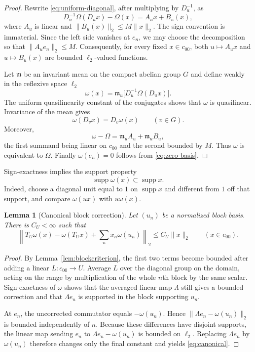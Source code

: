 \documentclass[11pt]{article}
\newtheorem{lemma}[theorem]{Lemma}
\newcommand{\czz}{c_{00}}
\newcommand{\supp}{\operatorname{supp}}
\newcommand{\Dop}[1]{D_{#1}}
\begin{document}
\begin{proof}
Rewrite \eqref{eq:uniform-diagonal}, after multiplying by $\Dop u^{-1}$,
as
\[
 \Dop u^{-1}\Omega(\Dop u x)-\Omega(x)=A_u x+B_u(x),
\]
where $A_u$ is linear and $\|B_u(x)\|_2\le M\|x\|_2$.  The sign convention
is immaterial.  Since the left side vanishes at $e_n$, we may choose the
decomposition so that $\|A_ue_n\|_2\le M$.  Consequently, for every fixed
$x\in\czz$, both $u\mapsto A_ux$ and $u\mapsto B_u(x)$ are bounded
$\ell_2$-valued functions.

Let $\mathfrak m$ be an invariant mean on the compact abelian group $G$ and
define weakly in the reflexive space $\ell_2$
\[
 \omega(x)=\mathfrak m_u\big[\Dop u^{-1}\Omega(\Dop u x)\big].
\]
The uniform quasilinearity constant of the conjugates shows that $\omega$ is
quasilinear.  Invariance of the mean gives
\[
 \omega(\Dop v x)=\Dop v\omega(x) \qquad(v\in G).
\]
Moreover,
\[
 \omega-\Omega=\mathfrak m_u A_u+\mathfrak m_u B_u,
\]
the first summand being linear on $\czz$ and the second bounded by $M$.
Thus $\omega$ is equivalent to $\Omega$.  Finally $\omega(e_n)=0$ follows
from \eqref{eq:zero-basis}.
\end{proof}

Sign-exactness implies the support property
\begin{equation}\label{eq:support}
 \supp\omega(x)\subset\supp x.
\end{equation}
Indeed, choose a diagonal unit equal to $1$ on $\supp x$ and different from
$1$ off that support, and compare $\omega(ux)$ with $u\omega(x)$.

\begin{lemma}[Canonical block correction]\label{lem:canonical}
Let $(u_n)$ be a normalized block basis.  There is $C_U<\infty$ such that
\begin{equation}\label{eq:canonical}
 \left\|T_U\omega(x)-\omega(T_Ux)+
       \sum_nx_n\omega(u_n)\right\|_2
 \le C_U\|x\|_2
 \qquad(x\in\czz).
\end{equation}
\end{lemma}

\begin{proof}
By Lemma~\ref{lem:blockcriterion}, the first two terms become bounded after
adding a linear $L:\czz\to U$.  Average $L$ over the diagonal group on the
domain, acting on the range by multiplication of the whole $n$th block by
the same scalar.  Sign-exactness of $\omega$ shows that the averaged linear map
$\Lambda$ still gives a bounded correction and that $\Lambda e_n$ is
supported in the block supporting $u_n$.

At $e_n$, the uncorrected commutator equals $-\omega(u_n)$.  Hence
$\|\Lambda e_n-\omega(u_n)\|_2$ is bounded independently of $n$.  Because
these differences have disjoint supports, the linear map sending
$e_n$ to $\Lambda e_n-\omega(u_n)$ is bounded on $\ell_2$.  Replacing
$\Lambda e_n$ by $\omega(u_n)$ therefore changes only the final constant
and yields \eqref{eq:canonical}.
\end{proof}
\end{document}
